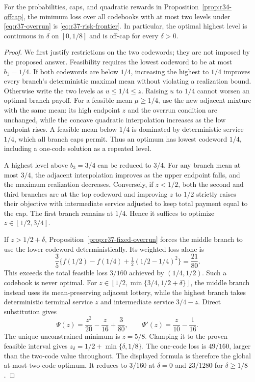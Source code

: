 \begin{proposition}\label{prop:r37-overrun-example}
For the probabilities, caps, and quadratic rewards in Proposition~\ref{prop:r34-offcap}, the minimum loss over all codebooks with at most two levels under \eqref{eq:r37-overrun} is \eqref{eq:r37-risk-frontier}. In particular, the optimal highest level is continuous in $\delta$ on $[0,1/8]$ and is off-cap for every $\delta>0$.
\end{proposition}
\begin{proof}
We first justify restrictions on the two codewords; they are not imposed by the proposed answer. Feasibility requires the lowest codeword to be at most $b_1=1/4$. If both codewords are below $1/4$, increasing the highest to $1/4$ improves every branch's deterministic maximal mean without violating a realization bound. Otherwise write the two levels as $u\leq1/4\leq z$. Raising $u$ to $1/4$ cannot worsen an optimal branch payoff. For a feasible mean $\mu\geq1/4$, use the new adjacent mixture with the same mean: its high endpoint $z$ and the overrun condition are unchanged, while the concave quadratic interpolation increases as the low endpoint rises. A feasible mean below $1/4$ is dominated by deterministic service $1/4$, which all branch caps permit. Thus an optimum has lowest codeword $1/4$, including a one-code solution as a repeated level.

A highest level above $b_3=3/4$ can be reduced to $3/4$. For any branch mean at most $3/4$, the adjacent interpolation improves as the upper endpoint falls, and the maximum realization decreases. Conversely, if $z<1/2$, both the second and third branches are at the top codeword and improving $z$ to $1/2$ strictly raises their objective with intermediate service adjusted to keep total payment equal to the cap. The first branch remains at $1/4$. Hence it suffices to optimize $z\in[1/2,3/4]$.

If $z>1/2+\delta$, Proposition~\ref{prop:r37-fixed-overrun} forces the middle branch to use the lower codeword deterministically. Its weighted loss alone is
\[
 \frac35\{f(1/2)-f(1/4)+\tfrac12(1/2-1/4)^2\}
 =\frac{21}{80}.
\]
This exceeds the total feasible loss $3/160$ achieved by $(1/4,1/2)$. Such a codebook is never optimal. For $z\in[1/2,\min\{3/4,1/2+\delta\}]$, the middle branch instead uses its mean-preserving adjacent lottery, while the highest branch takes deterministic terminal service $z$ and intermediate service $3/4-z$. Direct substitution gives
\[
 \Psi(z)=\frac{z^2}{20}-\frac z{16}+\frac3{80},\qquad
 \Psi'(z)=\frac z{10}-\frac1{16}.
\]
The unique unconstrained minimum is $z=5/8$. Clamping it to the proven feasible interval gives $z_\delta=1/2+\min\{\delta,1/8\}$. The one-code loss is $49/160$, larger than the two-code value throughout. The displayed formula is therefore the global at-most-two-code optimum. It reduces to $3/160$ at $\delta=0$ and $23/1280$ for $\delta\geq1/8$.
\end{proof}

